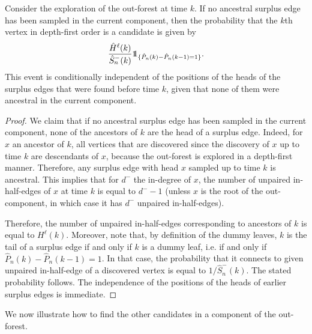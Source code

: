 \begin{proposition}\label{prop:probancestral}
Consider the exploration of the out-forest at time $k$. If no ancestral surplus edge has been sampled in the current component, then the probability that the $k$th vertex in depth-first order is a candidate is given by 
$$\frac{\hat{H}^\ell(k)}{\hat{S}_n^-(k)}\one_{\{\hat{P}_n(k)-\hat{P}_n(k-1)=1\}}.$$
This event is conditionally independent of the positions of the heads of the surplus edges that were found before time $k$, given that none of them were ancestral in the current component.
\end{proposition}
\begin{proof}
We claim that if no ancestral surplus edge has been sampled in the current component, none of the ancestors of $k$ are the head of a surplus edge. Indeed, for $x$ an ancestor of $k$, all vertices that are discovered since the discovery of $x$ up to time $k$ are descendants of $x$, because the out-forest is explored in a depth-first manner. Therefore, any surplus edge with head $x$ sampled up to time $k$ is ancestral. This implies that for $d^-$ the in-degree of $x$, the number of unpaired in-half-edges of $x$ at time $k$ is equal to $d^--1$ (unless $x$ is the root of the out-component, in which case it has $d^-$ unpaired in-half-edges).

Therefore, the number of unpaired in-half-edges corresponding to ancestors of $k$ is equal to $H^\ell(k)$. Moreover, note that, by definition of the dummy leaves, $k$ is the tail of a surplus edge if and only if $k$ is a dummy leaf, i.e. if and only if $\hat{P}_n(k)-\hat{P}_n(k-1)=1$. In that case, the probability that it connects to given unpaired in-half-edge of a discovered vertex is equal to $1/\hat{S}_n^-(k)$. The stated probability follows. The independence of the positions of the heads of earlier surplus edges is immediate.
\end{proof}

We now illustrate how to find the other candidates in a component of the out-forest. 

